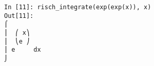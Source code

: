 ﻿\documentclass{article}
\begin{document}
\normalsize
\begin{Verbatim}
In [11]: risch_integrate(exp(exp(x)), x)
Out[11]: 
⌠         
⎮  ⎛ x⎞   
⎮  ⎝e ⎠   
⎮ e     dx
⌡         
\end{Verbatim}
\end{document}
